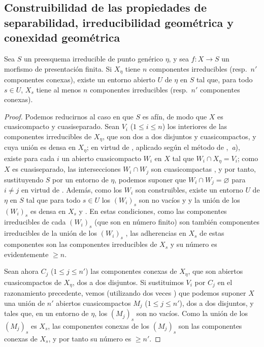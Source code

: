\subsection{Construibilidad de las propiedades de separabilidad, irreducibilidad geométrica y conexidad geométrica}
\label{subsection:IV.9.7}
\label{IV.9.7}

\begin{lemma}[9.7.1]
\label{IV.9.7.1}
Sea $S$ un preesquema irreducible de punto genérico $\eta$, y sea $f:X\to S$ un morfismo de presentación finita.
Si $X_\eta$ tiene $n$ componentes irreducibles (\textup{resp.}\ $n'$ componentes conexas), existe un entorno abierto $U$ de $\eta$ en $S$ tal que, para todo $s\in U$, $X_s$ tiene al menos $n$ componentes irreducibles (\textup{resp.}\ $n'$ componentes conexas).
\end{lemma}

\begin{proof}
Podemos reducirnos al caso en que $S$ es afín, de modo que $X$ es cuasicompacto y cuasiseparado.
Sean $V_i$ ($1\leqslant i\leqslant n$) los interiores de las componentes irreducibles de $X_\eta$, que son dos a dos disjuntos y cuasicompactos, y cuya unión es densa en $X_\eta$; en virtud de , aplicado según el método de ,~\emph{a}), existe para cada $i$ un abierto cuasicompacto $W_i$ en $X$ tal que $W_i\cap X_\eta=V_i$; como $X$ es cuasiseparado, las intersecciones $W_i\cap W_j$ son cuasicompactas , y por tanto, sustituyendo $S$ por un entorno de $\eta$, podemos suponer que $W_i\cap W_j=\varnothing$ para $i\neq j$ en virtud de .
Además, como los $W_i$ son construibles, existe un entorno $U$ de $\eta$ en $S$ tal que para todo $s\in U$ los $(W_i)_s$ son no vacíos  y  y la unión de los $(W_i)_s$ es densa en $X_s$  y .
En estas condiciones, como las componentes irreducibles de cada $(W_i)_s$ (que son en número finito) son también componentes irreducibles de la unión de los $(W_i)_s$ , las adherencias en $X_s$ de estas componentes son las componentes irreducibles de $X_s$  y su número es evidentemente $\geqslant n$.

Sean ahora $C_j$ ($1\leqslant j\leqslant n'$) las componentes conexas de $X_\eta$, que son abiertos cuasicompactos de $X_\eta$, dos a dos disjuntos.
Si sustituimos $V_i$ por $C_j$ en el razonamiento precedente, vemos (utilizando dos veces ) que podemos suponer $X$ una unión de $n'$ abiertos cuasicompactos $M_j$ ($1\leqslant j\leqslant n'$), dos a dos disjuntos, y tales que, en un entorno de $\eta$, los $(M_j)_s$ son no vacíos.
Como la unión de los $(M_j)_s$ es $X_s$, las componentes conexas de los $(M_j)_s$ son las componentes conexas de $X_s$, y por tanto su número es $\geqslant n'$.
\end{proof}

